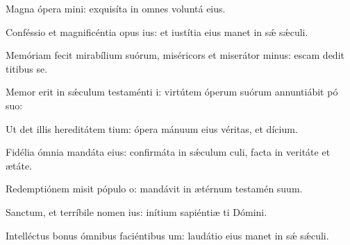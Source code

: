 \item {}

\item Magna ópera mini:\psstar{} exquisíta in omnes voluntá eius.

\item Conféssio et magnificéntia opus ius:\psstar{} et iustítia eius manet in sǽ sǽculi.

\item Memóriam fecit mirabílium suórum,\pscross{} miséricors et miserátor minus:\psstar{} escam dedit titibus se.

\item Memor erit in sǽculum testaménti i:\psstar{} virtútem óperum suórum annuntiábit pó suo:

\item Ut det illis hereditátem tium:\psstar{} ópera mánuum eius véritas, et dícium.

\item Fidélia ómnia mandáta eius:\pscross{} confirmáta in sǽculum culi,\psstar{} facta in veritáte et ætáte.

\item Redemptiónem misit pópulo o:\psstar{} mandávit in ætérnum testamén suum.

\item Sanctum, et terríbile nomen ius:\psstar{} inítium sapiéntiæ ti Dómini.

\item Intelléctus bonus ómnibus faciéntibus um:\psstar{} laudátio eius manet in sǽ sǽculi.